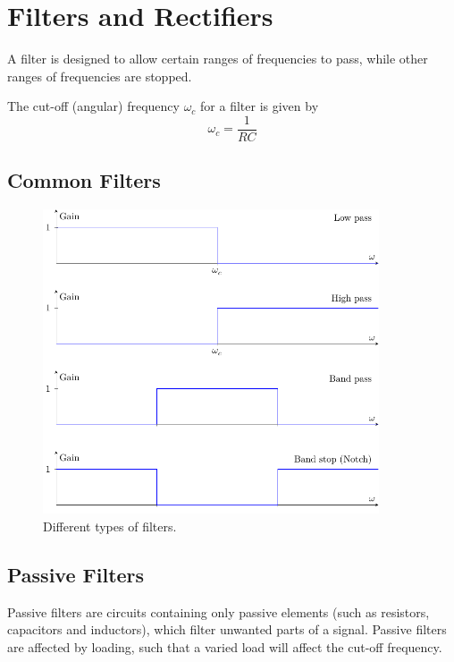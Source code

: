 \documentclass{article}
\begin{document}
\section{Filters and Rectifiers}
\begin{definition}[Filters]
    A filter is designed to allow certain ranges of frequencies to pass,
    while other ranges of frequencies are stopped.
\end{definition}
\begin{definition}
    The cut-off (angular) frequency \(\omega_c\) for a filter is given by
    \begin{equation*}
        \omega_c = \frac{1}{RC}
    \end{equation*}
\end{definition}
\subsection{Common Filters}
\begin{figure}[H]
    \centering
    \includegraphics[height = 9cm, keepaspectratio = true]{figures/filters.pdf}
    \caption{Different types of filters.}
\end{figure}
\subsection{Passive Filters}
Passive filters are circuits containing only passive elements
(such as resistors, capacitors and inductors),
which filter unwanted parts of a signal.
Passive filters are affected by loading, such that a varied load will
affect the cut-off frequency.
\end{document}
